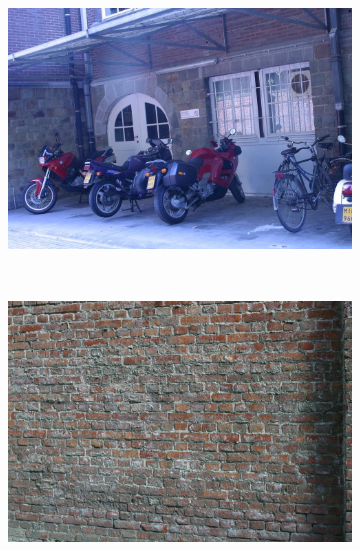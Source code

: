 \documentclass[review]{elsarticle}
\begin{document}
\begin{figure}[b]
\begin{subfigure}[t]{0.23\columnwidth}
        \centering
        \includegraphics[width=1\columnwidth]{images/acr/bikes1}
    \end{subfigure}%
    ~ %
    \begin{subfigure}[t]{0.23\columnwidth}
        \centering
        \includegraphics[width=1\columnwidth]{images/acr/wall1}
    \end{subfigure}%
    \vspace{1.5 mm}


\end{figure}
\end{document}

